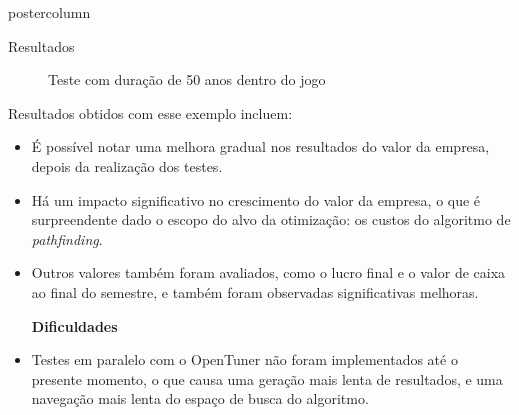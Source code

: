 \documentclass[final]{beamer}
\begin{document}
\begin{frame}
\begin{columns}
\begin{column}{.5\textwidth}
\begin{beamercolorbox}[center,wd=\textwidth]{postercolumn}
\begin{minipage}[T]{.95\textwidth}
{\begin{block}{Resultados}
                \begin{figure}[htp]
                  \centering
                  \caption{Teste com duração de 50 anos dentro do jogo}
                \end{figure}
                
                \vspace*{0.2cm}
                
                Resultados obtidos com esse exemplo incluem:
                \begin{itemize}
                  \item É possível notar uma melhora gradual nos resultados do valor da empresa, depois da realização dos testes.
                  \item Há um impacto significativo no crescimento do valor da empresa, o que é surpreendente dado o escopo do alvo da otimização: os custos do algoritmo de \textit{pathfinding}.
                  \item Outros valores também foram avaliados, como o lucro final e o valor de caixa ao final do semestre, e também foram observadas significativas melhoras.
                  
                  \vspace*{0.2cm}
                  
                  \textbf{Dificuldades}
                  \item Testes em paralelo com o OpenTuner não foram implementados até o presente momento, o que causa uma geração mais lenta de resultados, e uma navegação mais lenta do espaço de busca do algoritmo.
                \end{itemize}
                
                \vspace*{0.2cm}
            \end{block}
            
}
\end{minipage}
\end{beamercolorbox}
\end{column}
\end{columns}
\end{frame}
\end{document}
